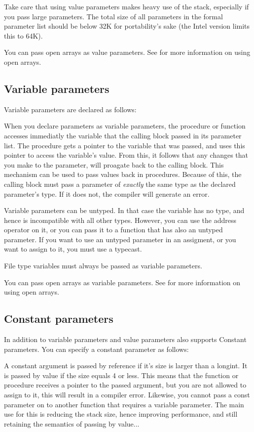 \documentclass{report}
\begin{document}
Take care that using value parameters makes heavy use of the stack,
especially if you pass large parameters. The total size of all parameters in
the formal parameter list should be below 32K for portability's sake (the
Intel version limits this to 64K).

You can pass open arrays as value parameters. See  for
more information on using open arrays.
\subsection{Variable parameters}
\label{se:varparams}
Variable parameters are declared as follows:

When you declare parameters as variable parameters, the procedure or
function accesses immediatly the variable that the calling block passed in
its parameter list. The procedure gets a pointer to the variable that was
passed, and uses this pointer to access the variable's value.
From this, it follows that any changes that you make to the parameter, will
proagate back to the calling block. This mechanism can be used to pass
values back in procedures.
Because of this, the calling block must pass a parameter of {\em exactly}
the same type as the declared parameter's type. If it does not, the compiler
will generate an error.

Variable parameters can be untyped. In that case the variable has no type,
and hence is incompatible with all other types. However, you can use the
address operator on it, or you can pass it to a function that has also an
untyped parameter. If you want to use an untyped parameter in an assigment,
or you want to assign to it, you must use a typecast.

File type variables must always be passed as variable parameters.

You can pass open arrays as variable parameters. See  for
more information on using open arrays.
\subsection{Constant parameters}
In addition to variable parameters and value parameters \fpc also supports
Constant parameters. You can specify a constant parameter as follows:

A constant argument is passed by reference if it's size is larger than a
longint. It is passed by value if the size equals 4 or less.
This means that the function or procedure receives a pointer to the passed
argument, but you are not allowed to assign to it, this will result in a
compiler error. Likewise, you cannot pass a const parameter on to another
function that requires a variable parameter.
The main use for this is reducing the stack size, hence improving
performance, and still retaining the semantics of passing by value...
\end{document}
